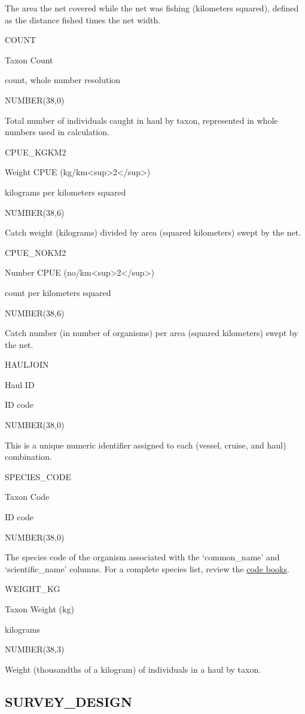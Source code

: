\documentclass[
  letterpaper,
  oneside,
  open=any]{scrbook}
\begin{document}
The area the net covered while the net was fishing (kilometers squared),
defined as the distance fished times the net width.

COUNT

Taxon Count

count, whole number resolution

NUMBER(38,0)

Total number of individuals caught in haul by taxon, represented in
whole numbers used in calculation.

CPUE\_KGKM2

Weight CPUE (kg/km\textless sup\textgreater2\textless/sup\textgreater)

kilograms per kilometers squared

NUMBER(38,6)

Catch weight (kilograms) divided by area (squared kilometers) swept by
the net.

CPUE\_NOKM2

Number CPUE (no/km\textless sup\textgreater2\textless/sup\textgreater)

count per kilometers squared

NUMBER(38,6)

Catch number (in number of organisms) per area (squared kilometers)
swept by the net.

HAULJOIN

Haul ID

ID code

NUMBER(38,0)

This is a unique numeric identifier assigned to each (vessel, cruise,
and haul) combination.

SPECIES\_CODE

Taxon Code

ID code

NUMBER(38,0)

The species code of the organism associated with the `common\_name' and
`scientific\_name' columns. For a complete species list, review the
\href{https://www.fisheries.noaa.gov/resource/document/groundfish-survey-species-code-manual-and-data-codes-manual}{code
books}.

WEIGHT\_KG

Taxon Weight (kg)

kilograms

NUMBER(38,3)

Weight (thousandths of a kilogram) of individuals in a haul by taxon.

\hypertarget{survey_design}{%
\subsection{SURVEY\_DESIGN}\label{survey_design}}
\end{document}
